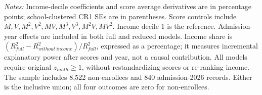 \begin{table}[!htbp]
\begin{tabular}{lrrrr}
\hline\hline\end{tabular}
\begin{minipage}{0.98\textwidth}\footnotesize
\textit{Notes:} Income-decile coefficients and score average derivatives are in percentage points; school-clustered CR1 SEs are in parentheses. Score controls include $M,V,M^2,V^2,MV,M^3,V^3,M^2V,MV^2$. Income decile 1 is the reference. Admission-year effects are included in both full and reduced models. Income share is $(R^2_{full}-R^2_{without\ income})/R^2_{full}$, expressed as a percentage; it measures incremental explanatory power after scores and year, not a causal contribution. All models require original $z_{math} \geq 1$, without restandardizing scores or re-ranking income. The sample includes 8,522 non-enrollees and 840 admission-2026 records. Either is the inclusive union; all four outcomes are zero for non-enrollees.
\end{minipage}
\end{table}
